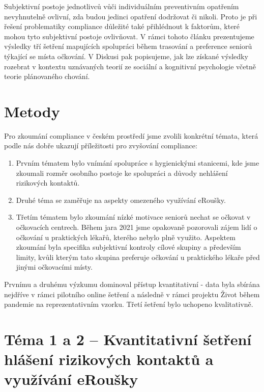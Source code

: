 Subjektivní postoje jednotlivců vůči individuálním preventivním opatřením nevyhnutelně ovlivní, zda budou jedinci opatření dodržovat či nikoli. Proto je při řešení problematiky compliance důležité také přihlédnout k faktorům, které mohou tyto subjektivní postoje ovlivňovat. V rámci tohoto článku prezentujeme výsledky tří šetření mapujících spolupráci během trasování a preference seniorů týkající se místa očkování. V Diskusi pak popisujeme, jak lze získané výsledky rozebrat v kontextu uznávaných teorií ze sociální a kognitivní psychologie včetně teorie plánovaného chování.

\section*{Metody} 

Pro zkoumání compliance v českém prostředí jsme zvolili konkrétní témata, která podle nás dobře ukazují příležitosti pro zvyšování compliance: 

\begin{enumerate}
\item Prvním tématem bylo vnímání spolupráce s hygienickými stanicemi, kde jsme zkoumali rozměr osobního postoje ke spolupráci a důvody nehlášení rizikových kontaktů. 
\item Druhé téma se zaměřuje na aspekty omezeného využívání eRoušky.
\item Třetím tématem bylo zkoumání nízké motivace seniorů nechat se očkovat v očkovacích centrech. Během jara 2021 jsme opakovaně pozorovali zájem lidí o očkování u praktických lékařů, kterého nebylo plně využito. Aspektem zkoumání byla specifika subjektivní kontroly cílové skupiny a především limity, kvůli kterým tato skupina preferuje očkování u praktického lékaře před jinými očkovacími místy.
\end{enumerate}

Prvnímu a druhému výzkumu dominoval přístup kvantitativní - data byla sbírána nejdříve v rámci pilotního online šetření a následně v rámci projektu Život během pandemie na reprezentativním vzorku. Třetí šetření bylo uchopeno kvalitativně.

\section*{Téma 1 a 2 – Kvantitativní šetření hlášení rizikových kontaktů a využívání eRoušky}
